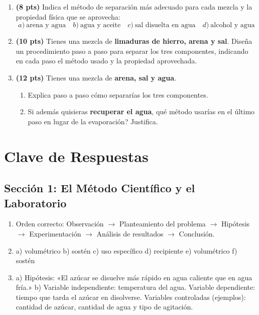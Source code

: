 \documentclass[12pt, letterpaper]{article}
\begin{document}
\begin{enumerate}[leftmargin=*]
  \item \textbf{(8 pts)} Indica el método de separación más adecuado para cada mezcla y la propiedad física que se aprovecha:
        \[
          a)\ \text{arena y agua} \quad b)\ \text{agua y aceite} \quad c)\ \text{sal disuelta en agua} \quad d)\ \text{alcohol y agua}
        \]

  \item \textbf{(10 pts)} Tienes una mezcla de \textbf{limaduras de hierro, arena y sal}. Diseña un procedimiento paso a paso para separar los tres componentes, indicando en cada paso el método usado y la propiedad aprovechada.

  \item \textbf{(12 pts)} Tienes una mezcla de \textbf{arena, sal y agua}.
        \begin{enumerate}[label=\alph*)]
          \item Explica paso a paso cómo separarías los tres componentes.
          \item Si además quisieras \textbf{recuperar el agua}, \textquestiondown qué método usarías en el último paso en lugar de la evaporación? Justifica.
        \end{enumerate}
\end{enumerate}

\newpage

\ifmwclaves
  \section{Clave de Respuestas}

  \subsection*{Sección 1: El Método Científico y el Laboratorio}

  \begin{enumerate}[leftmargin=*, label=\textbf{\arabic*.}]
    \item Orden correcto: Observación $\rightarrow$ Planteamiento del problema $\rightarrow$ Hipótesis $\rightarrow$ Experimentación $\rightarrow$ Análisis de resultados $\rightarrow$ Conclusión.

    \item a) volumétrico \quad b) sostén \quad c) uso específico \quad d) recipiente \quad e) volumétrico \quad f) sostén

    \item a) Hipótesis: «El azúcar se disuelve más rápido en agua caliente que en agua fría.»
          \quad b) Variable independiente: temperatura del agua. Variable dependiente: tiempo que tarda el azúcar en disolverse. Variables controladas (ejemplos): cantidad de azúcar, cantidad de agua y tipo de agitación.
  \end{enumerate}
\end{document}
